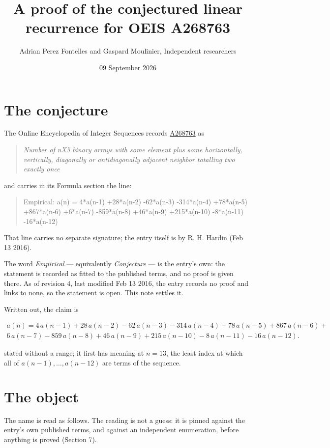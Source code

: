 \documentclass[11pt]{article}
\title{A proof of the conjectured linear recurrence for OEIS A268763}
\author{Adrian Perez Fontelles and Gaspard Moulinier, Independent researchers}
\date{09 September 2026}
\theoremstyle{definition}
\begin{document}
\maketitle
\section{The conjecture}

The Online Encyclopedia of Integer Sequences records \href{https://oeis.org/A268763}{A268763} as

\begin{quote}\itshape Number of nX5 binary arrays with some element plus some horizontally, vertically, diagonally or antidiagonally adjacent neighbor totalling two exactly once\end{quote}

and carries in its Formula section the line:

\begin{quote}\ttfamily Empirical: a(n) = 4*a(n-1) +28*a(n-2) -62*a(n-3) -314*a(n-4) +78*a(n-5) +867*a(n-6) +6*a(n-7) -859*a(n-8) +46*a(n-9) +215*a(n-10) -8*a(n-11) -16*a(n-12)\end{quote}

That line carries no separate signature; the entry itself is by R. H. Hardin (Feb 13 2016).

The word {\itshape Empirical} --- equivalently {\itshape Conjecture} --- is the entry's own: the statement is recorded as fitted to the published terms, and no proof is given there. As of revision 4, last modified Feb 13 2016, the entry records no proof and links to none, so the statement is open. This note settles it.

Written out, the claim is

\begin{multline*} a(n) = 4\,a(n-1) + 28\,a(n-2) - 62\,a(n-3) - 314\,a(n-4) + 78\,a(n-5) + 867\,a(n-6) + \\ 6\,a(n-7) - 859\,a(n-8) + 46\,a(n-9) + 215\,a(n-10) - 8\,a(n-11) - 16\,a(n-12). \end{multline*}

stated without a range; it first has meaning at $n = 13$, the least index at which all of $a(n-1),\dots,a(n-12)$ are terms of the sequence.

\section{The object}

The name is read as follows. The reading is not a guess: it is pinned against the entry's own published terms, and against an independent enumeration, before anything is proved (Section 7).
\end{document}
